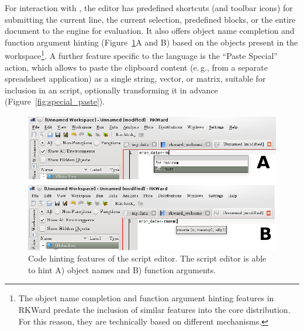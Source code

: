 For interaction with , the editor has
predefined shortcuts (and toolbar icons) for submitting the current line, the current 
selection, predefined blocks, or the entire document to the
 engine for evaluation. It also 
offers object name completion and function argument hinting 
(Figure~\ref{fig:code_hinting}A and B) based on the objects present in
the  workspace\footnote{The object name
completion and function argument hinting features in RKWard predate the
inclusion of similar features into the core
 distribution. For this reason, they are
technically based on different mechanisms.}. A further feature specific
to the  language is the
``Paste Special'' action, which allows to
paste the clipboard content (e.\,g., from a separate spreadsheet
application) as a single string, vector, or matrix, suitable
for inclusion in an  script, optionally
transforming it in advance (Figure~\ref{fig:special_paste}).

\begin{figure}[t!]
 \centering
 \includegraphics[width=15.5cm]{../figures/code_hinting.png}
 \caption{Code hinting features of the script editor. The script editor is able to hint A)  object names
and B) function arguments.}
 \label{fig:code_hinting}
\end{figure}

